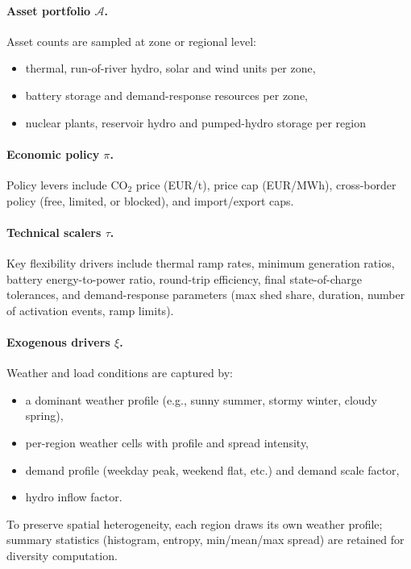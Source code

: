 \documentclass{article}
\begin{document}
\paragraph{Asset portfolio $\mathcal{A}$.}
Asset counts are sampled at zone or regional level:
\begin{itemize}[noitemsep]
  \item thermal, run-of-river hydro, solar and wind units per zone,
  \item battery storage and demand-response resources per zone,
  \item nuclear plants, reservoir hydro and pumped-hydro storage per region
\end{itemize}

\paragraph{Economic policy $\pi$.}
Policy levers include CO$_2$ price (EUR/t), price cap (EUR/MWh), cross-border policy (free, limited, or blocked), and import/export caps.

\paragraph{Technical scalers $\tau$.}
Key flexibility drivers include thermal ramp rates, minimum generation ratios, battery energy-to-power ratio, round-trip efficiency, final state-of-charge tolerances, and demand-response parameters (max shed share, duration, number of activation events, ramp limits).

\paragraph{Exogenous drivers $\xi$.}
Weather and load conditions are captured by:
\begin{itemize}[noitemsep]
  \item a dominant weather profile (e.g., sunny summer, stormy winter, cloudy spring),
  \item per-region weather cells with profile and spread intensity,
  \item demand profile (weekday peak, weekend flat, etc.) and demand scale factor,
  \item hydro inflow factor.
\end{itemize}
To preserve spatial heterogeneity, each region draws its own weather profile; summary statistics (histogram, entropy, min/mean/max spread) are retained for diversity computation.
\end{document}

